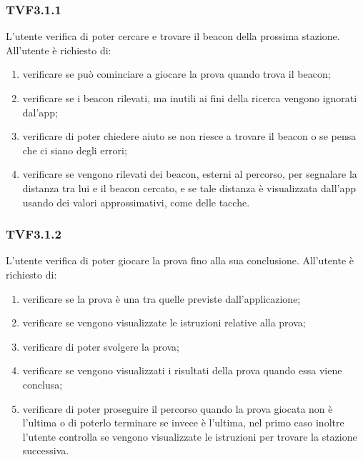 		\subsubsection{TVF3.1.1}
			L'utente verifica di poter cercare e trovare il beacon della prossima stazione.
			All'utente è richiesto di:
			\begin{enumerate}
				\item verificare se può cominciare a giocare la prova quando trova il beacon;
				\item verificare se i beacon rilevati, ma inutili ai fini della ricerca vengono ignorati dal'app;
				\item verificare di poter chiedere aiuto se non riesce a trovare il beacon o se pensa che ci siano degli errori;
				\item verificare se vengono rilevati dei beacon, esterni al percorso, per segnalare la distanza tra lui e il beacon cercato, e se tale distanza è visualizzata dall'app usando dei valori approssimativi, come delle tacche.
			\end{enumerate}
		\subsubsection{TVF3.1.2}
			L'utente verifica di poter giocare la prova fino alla sua conclusione.
			All'utente è richiesto di:
			\begin{enumerate}
				\item verificare se la prova è una tra quelle previste dall'applicazione;
				\item verificare se vengono visualizzate le istruzioni relative alla prova;
				\item verificare di poter svolgere la prova;
				\item verificare se vengono visualizzati i risultati della prova quando essa viene conclusa;
				\item verificare di poter proseguire il percorso quando la prova giocata non è l'ultima o di poterlo terminare se invece è l'ultima, nel primo caso inoltre l'utente controlla se vengono visualizzate le istruzioni per trovare la stazione successiva.
			\end{enumerate}
